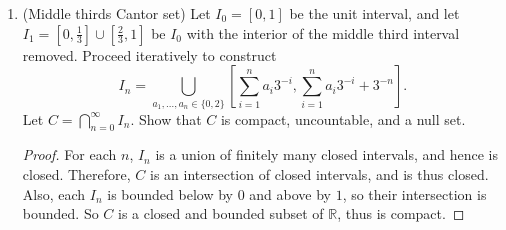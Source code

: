 \documentclass[10pt]{article}
\newcommand{\R}{\mathbb{R}}
\newcommand{\M}{\mathcal{M}}
\begin{document}
\begin{enumerate}
\begin{enumerate}
\begin{proof}
We have already checked that $\rho(E,E) = \mu(E \sd E) = 0$ for all $E \in \M$.  Also, if $\rho(A,B) = 0$ for any $A, B \in \M$, then $A \sim B$, therefore $\rho$ is positive-definite.  Clearly, $\rho$ is symmetric because $A \sd B = B \sd A$.  The triangle inequality also holds:
\begin{align*}
\rho(E,G) &= \mu(E \sd G) \\
&= \mu((E \sd F) \sd (F \sd G)) \\
&\leq \mu((E \sd F) \cup (F \sd G)) \\
&= \mu(E \sd F) + \mu(F \sd G) \\
&= \rho(E,F) + \rho(F,G)
\end{align*}
where the inequality holds because $A \sd B \subseteq A \cup B$ for any sets $A,B \in \M$.  Thus $\rho$ is a metric on $\M / \sim$.
\end{proof}

\end{enumerate}

\item (Middle thirds Cantor set) Let $I_0 = [0,1]$ be the unit interval, and let $I_1 = [0,\frac{1}{3}] \cup [\frac23 , 1]$ be $I_0$ with the interior of the middle third interval removed.  Proceed iteratively to construct
$$
I_n = \bigcup_{a_1, \dots , a_n \in \{0,2\}} \left[ \sum_{i=1}^n a_i 3^{-i} , \sum_{i=1}^n a_i 3^{-i} + 3^{-n} \right].
$$
Let $C = \bigcap_{n=0}^\infty I_n$.  Show that $C$ is compact, uncountable, and a null set.

\begin{proof}

For each $n$, $I_n$ is a union of finitely many closed intervals, and hence is closed.  Therefore, $C$ is an intersection of closed intervals, and is thus closed.  Also, each $I_n$ is bounded below by $0$ and above by $1$, so their intersection is bounded.  So $C$ is a closed and bounded subset of $\R$, thus is compact.

\begin{comment}

It is well-known that the Cantor set is defined by the recurrence
$$I_n = \frac{I_n}{3} \cup \left(\frac23 + \frac{I_n}{3}\right), \hspace{1cm} I_1 = \left[0,\frac13\right] \cup \left[\frac23 , 1\right]$$
but I will show that the given explicit formula for $I_n$ solves this recurrence (and is thus the unique solution).


\end{comment}
\end{proof}
\end{enumerate}
\end{document}
